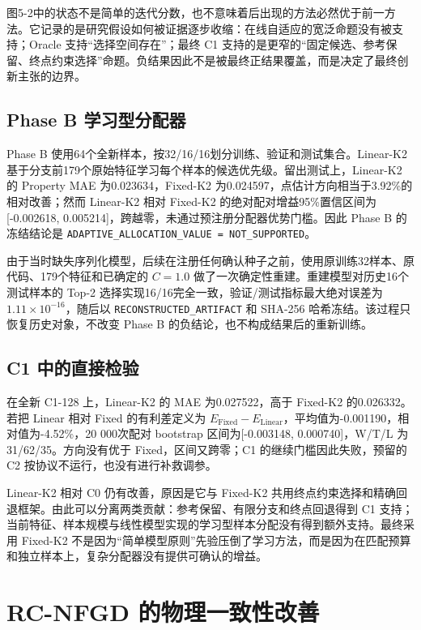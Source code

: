 图5-2中的状态不是简单的迭代分数，也不意味着后出现的方法必然优于前一方法。它记录的是研究假设如何被证据逐步收缩：在线自适应的宽泛命题没有被支持；Oracle 支持``选择空间存在''；最终 C1 支持的是更窄的``固定候选、参考保留、终点约束选择''命题。负结果因此不是被最终正结果覆盖，而是决定了最终创新主张的边界。

\subsection{Phase B 学习型分配器}

Phase B 使用64个全新样本，按32/16/16划分训练、验证和测试集合。Linear-K2 基于分支前179个原始特征学习每个样本的候选优先级。留出测试上，Linear-K2 的 Property MAE 为0.023634，Fixed-K2 为0.024597，点估计方向相当于3.92\%的相对改善；然而 Linear-K2 相对 Fixed-K2 的绝对配对增益95\%置信区间为{[}-0.002618, 0.005214{]}，跨越零，未通过预注册分配器优势门槛。因此 Phase B 的冻结结论是 \texttt{ADAPTIVE\_ALLOCATION\_VALUE\ =\ NOT\_SUP\allowbreak PORTED}。

由于当时缺失序列化模型，后续在注册任何确认种子之前，使用原训练32样本、原代码、179个特征和已确定的 \(C=1.0\) 做了一次确定性重建。重建模型对历史16个测试样本的 Top-2 选择实现16/16完全一致，验证/测试指标最大绝对误差为 \(1.11\times10^{-16}\)，随后以 \texttt{RECONSTRUCTED\_ARTIFACT} 和 SHA-256 哈希冻结。该过程只恢复历史对象，不改变 Phase B 的负结论，也不构成结果后的重新训练。

\subsection{C1 中的直接检验}

在全新 C1-128 上，Linear-K2 的 MAE 为0.027522，高于 Fixed-K2 的0.026332。若把 Linear 相对 Fixed 的有利差定义为 \(E_{\mathrm{Fixed}}-E_{\mathrm{Linear}}\)，平均值为-0.001190，相对值为-4.52\%，20 000次配对 bootstrap 区间为{[}-0.003148, 0.000740{]}，W/T/L 为31/62/35。方向没有优于 Fixed，区间又跨零；C1 的继续门槛因此失败，预留的 C2 按协议不运行，也没有进行补救调参。

Linear-K2 相对 C0 仍有改善，原因是它与 Fixed-K2 共用终点约束选择和精确回退框架。由此可以分离两类贡献：参考保留、有限分支和终点回退得到 C1 支持；当前特征、样本规模与线性模型实现的学习型样本分配没有得到额外支持。最终采用 Fixed-K2 不是因为``简单模型原则''先验压倒了学习方法，而是因为在匹配预算和独立样本上，复杂分配器没有提供可确认的增益。

\section{RC-NFGD 的物理一致性改善}

